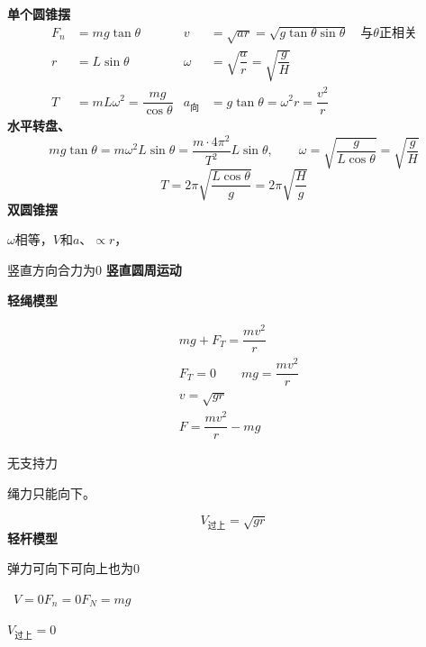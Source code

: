 \textbf{单个圆锥摆}
\begin{align*}
F_n&=mg\tan\theta & v&=\sqrt{ar}=\sqrt{g\tan\theta\sin\theta}\quad\text{与}\theta\text{正相关}\\ %
r&=L\sin\theta & \omega&=\sqrt{\dfrac{a}{r}}=\sqrt{\dfrac{g}{H}}\\
T&=mL\omega^2=\dfrac{mg}{\cos\theta} & a_{\text{向}}&=g\tan\theta=\omega^2r=\dfrac{v^2}{r}
\end{align*}
\textbf{水平转盘、}
\[ mg\tan\theta=m\omega^2L\sin\theta=\dfrac{m\cdot4\pi^2}{T^2}L\sin\theta,\qquad \omega=\sqrt{\dfrac{g}{L\cos\theta}}=\sqrt{\dfrac{g}{H}} \]
\[ T=2\pi\sqrt{\dfrac{L\cos\theta}{g}}=2\pi\sqrt{\dfrac{H}{g}} \]
\textbf{双圆锥摆}


$\omega$相等，$V$和$a$、$\propto r$，

竖直方向合力为0
\textbf{竖直圆周运动}

\textbf{轻绳模型}


\begin{align*}
& mg+F_T=\dfrac{mv^2}{r}\\
& F_T=0\qquad mg=\dfrac{mv^2}{r}\\
& v=\sqrt{gr}\\
& F=\dfrac{mv^2}{r}-mg
\end{align*}

无支持力

绳力只能向下。

\[ V_{\text{过上}}=\sqrt{gr} \]
\textbf{轻杆模型}


弹力可向下\quad 可向上\quad 也为0

\ $V=0$\quad $F_n=0$\quad $F_N=mg$

$V_{\text{过上}}=0$

